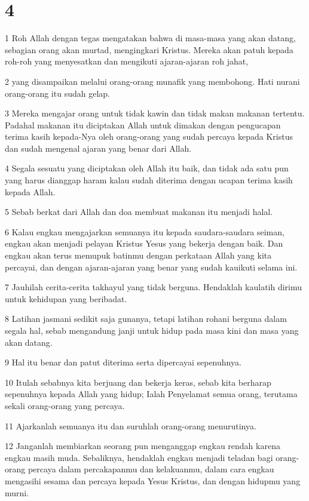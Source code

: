 \chapter{4}

\par 1 Roh Allah dengan tegas mengatakan bahwa di masa-masa yang akan datang, sebagian orang akan murtad, mengingkari Kristus. Mereka akan patuh kepada roh-roh yang menyesatkan dan mengikuti ajaran-ajaran roh jahat,
\par 2 yang disampaikan melalui orang-orang munafik yang membohong. Hati nurani orang-orang itu sudah gelap.
\par 3 Mereka mengajar orang untuk tidak kawin dan tidak makan makanan tertentu. Padahal makanan itu diciptakan Allah untuk dimakan dengan pengucapan terima kasih kepada-Nya oleh orang-orang yang sudah percaya kepada Kristus dan sudah mengenal ajaran yang benar dari Allah.
\par 4 Segala sesuatu yang diciptakan oleh Allah itu baik, dan tidak ada satu pun yang harus dianggap haram kalau sudah diterima dengan ucapan terima kasih kepada Allah.
\par 5 Sebab berkat dari Allah dan doa membuat makanan itu menjadi halal.
\par 6 Kalau engkau mengajarkan semuanya itu kepada saudara-saudara seiman, engkau akan menjadi pelayan Kristus Yesus yang bekerja dengan baik. Dan engkau akan terus memupuk batinmu dengan perkataan Allah yang kita percayai, dan dengan ajaran-ajaran yang benar yang sudah kauikuti selama ini.
\par 7 Jauhilah cerita-cerita takhayul yang tidak berguna. Hendaklah kaulatih dirimu untuk kehidupan yang beribadat.
\par 8 Latihan jasmani sedikit saja gunanya, tetapi latihan rohani berguna dalam segala hal, sebab mengandung janji untuk hidup pada masa kini dan masa yang akan datang.
\par 9 Hal itu benar dan patut diterima serta dipercayai sepenuhnya.
\par 10 Itulah sebabnya kita berjuang dan bekerja keras, sebab kita berharap sepenuhnya kepada Allah yang hidup; Ialah Penyelamat semua orang, terutama sekali orang-orang yang percaya.
\par 11 Ajarkanlah semuanya itu dan suruhlah orang-orang menurutinya.
\par 12 Janganlah membiarkan seorang pun menganggap engkau rendah karena engkau masih muda. Sebaliknya, hendaklah engkau menjadi teladan bagi orang-orang percaya dalam percakapanmu dan kelakuanmu, dalam cara engkau mengasihi sesama dan percaya kepada Yesus Kristus, dan dengan hidupmu yang murni.
